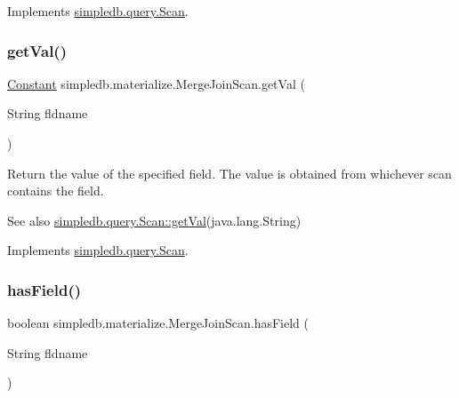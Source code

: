 Implements \hyperlink{interfacesimpledb_1_1query_1_1Scan_a922e219fee53ecfa6163525f9e3ef222}{simpledb.\+query.\+Scan}.

\mbox{\label{classsimpledb_1_1materialize_1_1MergeJoinScan_a7c6aaa5825fbb2b3ca2ebd7ceb49ba5d}} 
\subsubsection{\texorpdfstring{get\+Val()}{getVal()}}
{\footnotesize\ttfamily \hyperlink{classsimpledb_1_1query_1_1Constant}{Constant} simpledb.\+materialize.\+Merge\+Join\+Scan.\+get\+Val (\begin{DoxyParamCaption}\item[{String}]{fldname }\end{DoxyParamCaption})\hspace{0.3cm}{\ttfamily [inline]}}

Return the value of the specified field. The value is obtained from whichever scan contains the field. \begin{DoxySeeAlso}{See also}
\hyperlink{interfacesimpledb_1_1query_1_1Scan_aca80bca2857c983a88834bf6c01ee5ca}{simpledb.\+query.\+Scan\+::get\+Val}(java.\+lang.\+String) 
\end{DoxySeeAlso}


Implements \hyperlink{interfacesimpledb_1_1query_1_1Scan_aca80bca2857c983a88834bf6c01ee5ca}{simpledb.\+query.\+Scan}.

\mbox{\label{classsimpledb_1_1materialize_1_1MergeJoinScan_a1450a0e4f554e53c628ed66d39020fc6}} 
\subsubsection{\texorpdfstring{has\+Field()}{hasField()}}
{\footnotesize\ttfamily boolean simpledb.\+materialize.\+Merge\+Join\+Scan.\+has\+Field (\begin{DoxyParamCaption}\item[{String}]{fldname }\end{DoxyParamCaption})\hspace{0.3cm}{\ttfamily [inline]}}

